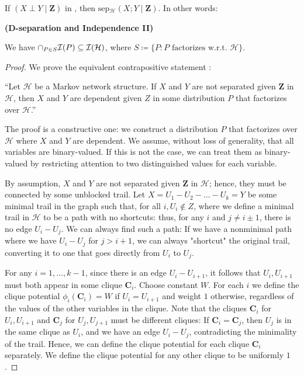\documentclass{article}
\newcommand{\bfs}[1]{\textbf{({#1}) }}
\begin{document}
 If $(X \perp Y \mid \boldsymbol{Z})$ in , then {$\mathrm{sep}$}$_{\mathcal{H}}(X ; Y \mid \boldsymbol{Z}) .$  In other words:
\begin{thma}\bfs{D-separation and Independence II}\label{thm:sep2}\\
\centerline{We have $\cap_{P\in S}\mathcal{I}(P) \subseteq \mathcal{I}(\mathcal{H})$, where  $S\coloneqq \{P: P \text{ factorizes w.r.t. $\mathcal{H}$}\}$.}
\end{thma}
\begin{proof} We prove the equivalent contrapositive statement :

``Let $\mathcal{H}$ be a Markov network structure. If $X$ and $Y$ are not separated given $\boldsymbol{Z}$ in $\mathcal{H}$, then $X$ and $Y$ are dependent given $Z$ in some distribution $P$ that factorizes over $\mathcal{H}$.''

The proof is a constructive one: we construct a distribution $P$ that factorizes over $\mathcal{H}$ where $X$ and $Y$ are dependent. We assume, without loss of generality, that all variables are binary-valued. If this is not the case, we can treat them as binary-valued by restricting attention to two distinguished values for each variable.

By assumption, $X$ and $Y$ are not separated given $\boldsymbol{Z}$ in $\mathcal{H}$; hence, they must be connected by some unblocked trail. Let $X=U_{1}-U_{2}-\ldots-U_{k}=Y$ be some minimal trail in the graph such that, for all $i, U_{i} \notin Z$, where we define a minimal trail in $\mathcal{H}$ to be a path with no shortcuts: thus, for any $i$ and $j \neq i \pm 1$, there is no edge $U_{i}-U_{j} .$ We can always find such a path: If we have a nonminimal path where we have $U_{i}-U_{j}$ for $j>i+1$, we can always "shortcut" the original trail, converting it to one that goes directly from $U_{i}$ to $U_{j}$.

For any $i=1, \ldots, k-1$, since there is an edge $U_{i}-U_{i+1}$, it follows that $U_{i}, U_{i+1}$ must both appear in some clique $\boldsymbol{C}_{i} .$ Choose constant $W$. For each $i$ we define the clique potential $\phi_{i}\left(\boldsymbol{C}_{i}\right)=W$ if $U_{i}=U_{i+1}$ and weight $1$ otherwise, regardless of the values of the other variables in the clique. Note that the cliques $\boldsymbol{C}_{i}$ for $U_{i}, U_{i+1}$ and $\boldsymbol{C}_{j}$ for $U_{j}, U_{j+1}$ must be different cliques: If $\boldsymbol{C}_{i}=\boldsymbol{C}_{j}$, then $U_{j}$ is in the same clique as $U_{i}$, and we have an edge $U_{i}-U_{j}$, contradicting the minimality of the trail. Hence, we can define the clique potential for each clique $\boldsymbol{C}_{i}$ separately. We define the clique potential for any other clique to be uniformly $1$.


\end{proof}
\end{document}
